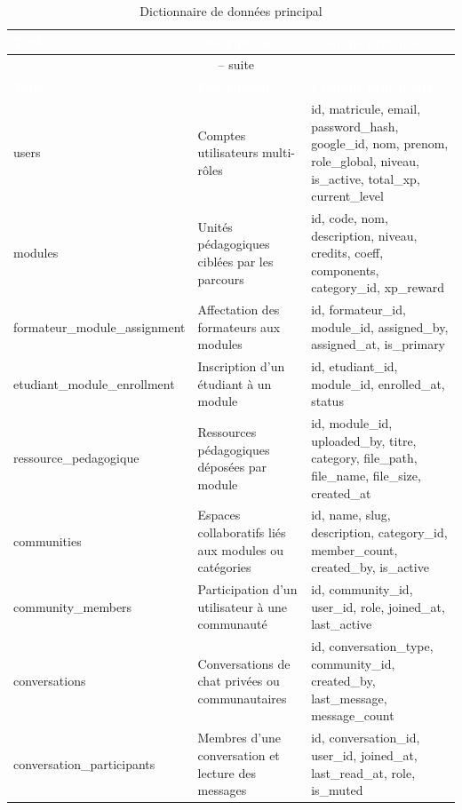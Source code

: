 \documentclass[12pt,a4paper,oneside]{report}
\begin{document}
\renewcommand{\arraystretch}{1.15}
\begin{longtable}{|p{3.4cm}|p{4.4cm}|p{4.4cm}|}
\caption{Dictionnaire de données principal}\label{tab:dictionnaire\_donnees}\\
\hline
\rowcolor{ustoblue}
\textcolor{white}{\textbf{Table}} & \textcolor{white}{\textbf{Description}} & \textcolor{white}{\textbf{Champs principaux}} \\
\hline
\endfirsthead
\multicolumn{3}{c}{\tablename~\thetable{} -- suite} \\
\hline
\rowcolor{ustoblue}
\textcolor{white}{\textbf{Table}} & \textcolor{white}{\textbf{Description}} & \textcolor{white}{\textbf{Champs principaux}} \\
\hline
\endhead
\hline
\endfoot

users & Comptes utilisateurs multi-rôles & id, matricule, email, password\_hash, google\_id, nom, prenom, role\_global, niveau, is\_active, total\_xp, current\_level \\
\hline
modules & Unités pédagogiques ciblées par les parcours & id, code, nom, description, niveau, credits, coeff, components, category\_id, xp\_reward \\
\hline
formateur\_module\_assignment & Affectation des formateurs aux modules & id, formateur\_id, module\_id, assigned\_by, assigned\_at, is\_primary \\
\hline
etudiant\_module\_enrollment & Inscription d'un étudiant à un module & id, etudiant\_id, module\_id, enrolled\_at, status \\
\hline
ressource\_pedagogique & Ressources pédagogiques déposées par module & id, module\_id, uploaded\_by, titre, category, file\_path, file\_name, file\_size, created\_at \\
\hline
communities & Espaces collaboratifs liés aux modules ou catégories & id, name, slug, description, category\_id, member\_count, created\_by, is\_active \\
\hline
community\_members & Participation d'un utilisateur à une communauté & id, community\_id, user\_id, role, joined\_at, last\_active \\
\hline
conversations & Conversations de chat privées ou communautaires & id, conversation\_type, community\_id, created\_by, last\_message, message\_count \\
\hline
conversation\_participants & Membres d'une conversation et lecture des messages & id, conversation\_id, user\_id, joined\_at, last\_read\_at, role, is\_muted \\
\hline

\end{longtable}
\end{document}

